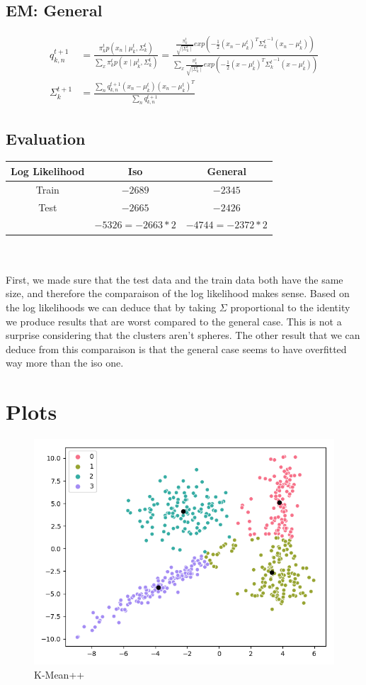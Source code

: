 \documentclass[a4paper]{article}
\begin{document}
\subsection{EM: General}
\begin{align*}
q^{t+1}_{k,n} &= \frac{\pi_k^t p(x_n \mid \mu_k^t, \Sigma_k^t)}{\sum_{x} \pi_k^t p(x \mid \mu_k^t, \Sigma_k^t)} =
\frac{\frac{\pi_k^t}{\sqrt{\mid \Sigma_k^t \mid}} exp(-\frac{1}{2}(x_n-\mu_k^t)^T {\Sigma_k^t}^{-1} (x_n - \mu_k^t))}{\sum_{x} \frac{\pi_k^t}{\sqrt{\mid \Sigma_k^t \mid}} exp(-\frac{1}{2}(x-\mu_k^t)^T{\Sigma_k^t}^{-1}(x-\mu_k^t))} \\
\Sigma_k^{t+1} &= \frac{\sum_n q^{t+1}_{k,n}(x_n-\mu_k^t)(x_n - \mu_k^t)^T}{\sum_n q^{t+1}_{k,n}}
\end{align*}
\subsection{Evaluation}
\begin{tabular}{|c|c|c|}
\hline 
Log Likelihood & Iso & General \\ 
\hline 
Train & $-2689$ & $-2345$ \\ 
\hline 
Test & $-2665$ & $-2426$ \\
\hline
[Train,Test] & $-5326= -2663 * 2$ & $-4744=-2372*2$  \\
\hline 
\end{tabular}
\\\\
First, we made sure that the test data and the train data both have the same size, and therefore the comparaison of the log likelihood makes sense.
Based on the log likelihoods we can deduce that by taking $\Sigma$ proportional to the identity we produce results that are worst compared to the general case. This is not a surprise considering that the clusters aren't spheres. The other result that we can deduce from this comparaison is that the general case seems to have overfitted way more than the iso one.
\newpage
\section{Plots}
\begin{figure}[hbtp]
\caption{K-Mean++}
\centering
\includegraphics[scale=.4]{kmean.png}
\end{figure}
\end{document}
